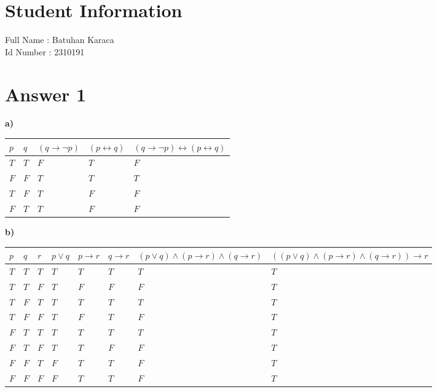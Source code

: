 \documentclass[11pt]{article}
\begin{document}
\section*{Student Information } 
Full Name : Batuhan Karaca \\
Id Number : 2310191 \\

\section*{Answer 1}
\begin{flushleft}
    \textbf{a)} 
\end{flushleft}
\begin{table}[H]
    \begin{tabular}{|l|l|l|l|l|}
        \hline
        $p$ & $q$ & $(q \rightarrow \neg p)$ & $(p \leftrightarrow q)$ & $(q \rightarrow \neg p) \leftrightarrow (p \leftrightarrow q)$ \\
        \hline
        $T$ & $T$ & $F$ & $T$ & $F$ \\
        \hline
        $F$ & $F$ & $T$ & $T$ & $T$ \\
        \hline
        $T$ & $F$ & $T$ & $F$ & $F$ \\
        \hline
        $F$ & $T$ & $T$ & $F$ & $F$ \\
        \hline
    \end{tabular}
\end{table}
\begin{flushleft}
    \textbf{b)} 
\end{flushleft}
\begin{table}[H]
    \begin{tabular}{|l|l|l|l|l|l|l|l|}
        \hline
        $p$ & $q$ & $r$ & $p \lor q$ & $p \rightarrow r$ & $q \rightarrow r$ & $(p \lor q) \land (p \rightarrow r) \land (q \rightarrow r)$ & $((p \lor q) \land (p \rightarrow r) \land (q \rightarrow r) ) \rightarrow r$ \\
        \hline
        $T$ & $T$ & $T$ & $T$ & $T$ & $T$ & $T$ & $T$ \\ %
        \hline
        $T$ & $T$ & $F$ & $T$ & $F$ & $F$ & $F$ & $T$  \\ %
        \hline
        $T$ & $F$ & $T$ & $T$ & $T$ & $T$ & $T$ & $T$ \\ %
        \hline
        $T$ & $F$ & $F$ & $T$ & $F$ & $T$ & $F$ & $T$ \\ %
        \hline
        $F$ & $T$ & $T$ & $T$ & $T$ & $T$ & $T$ & $T$ \\ %
        \hline
        $F$ & $T$ & $F$ & $T$ & $T$ & $F$ & $F$ & $T$ \\ %
        \hline
        $F$ & $F$ & $T$ & $F$ & $T$ & $T$ & $F$ & $T$ \\ %
        \hline
        $F$ & $F$ & $F$ & $F$ & $T$ & $T$ & $F$ & $T$ \\ %
        \hline
    \end{tabular}
\end{table}
\end{document}
